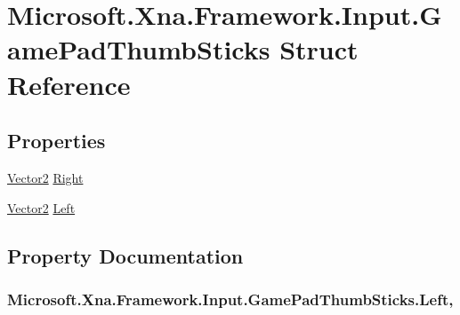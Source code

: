 \hypertarget{struct_microsoft_1_1_xna_1_1_framework_1_1_input_1_1_game_pad_thumb_sticks}{}\section{Microsoft.\+Xna.\+Framework.\+Input.\+Game\+Pad\+Thumb\+Sticks Struct Reference}
\label{struct_microsoft_1_1_xna_1_1_framework_1_1_input_1_1_game_pad_thumb_sticks}
\subsection*{Properties}
\begin{DoxyCompactItemize}
\item 
\hyperlink{struct_microsoft_1_1_xna_1_1_framework_1_1_vector2}{Vector2} \hyperlink{struct_microsoft_1_1_xna_1_1_framework_1_1_input_1_1_game_pad_thumb_sticks_a44bf0505970c4f29912234dad5cf9e6f}{Right}
\item 
\hyperlink{struct_microsoft_1_1_xna_1_1_framework_1_1_vector2}{Vector2} \hyperlink{struct_microsoft_1_1_xna_1_1_framework_1_1_input_1_1_game_pad_thumb_sticks_aabe92e02211a0ebe3ca740457a419d2d}{Left}
\end{DoxyCompactItemize}


\subsection{Property Documentation}
\hypertarget{struct_microsoft_1_1_xna_1_1_framework_1_1_input_1_1_game_pad_thumb_sticks_aabe92e02211a0ebe3ca740457a419d2d}{}
\subsubsection[{Left}]{ Microsoft.\+Xna.\+Framework.\+Input.\+Game\+Pad\+Thumb\+Sticks.\+Left\hspace{0.3cm}{\ttfamily [get]}, {\ttfamily [set]}}\label{struct_microsoft_1_1_xna_1_1_framework_1_1_input_1_1_game_pad_thumb_sticks_aabe92e02211a0ebe3ca740457a419d2d}
\hypertarget{struct_microsoft_1_1_xna_1_1_framework_1_1_input_1_1_game_pad_thumb_sticks_a44bf0505970c4f29912234dad5cf9e6f}{}
